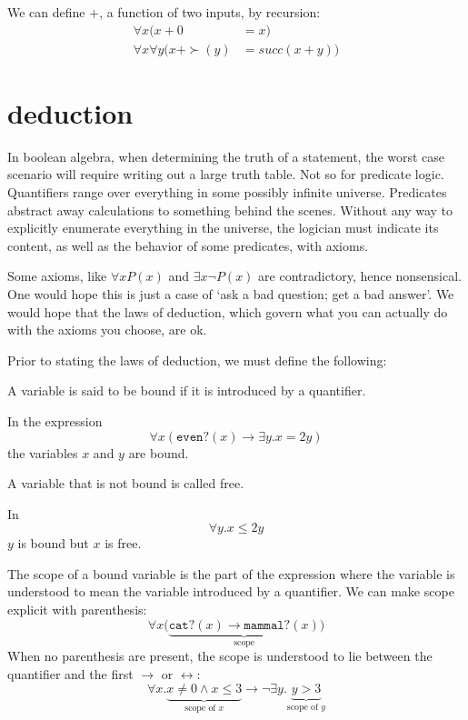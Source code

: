\documentclass{scrbook}
\renewcommand{\implies}{\to}
\renewcommand{\iff}{\leftrightarrow}
\begin{document}
\begin{defn}[plus]
  \label{defn:peano:+}
  We can define $+$, a function of two inputs, by recursion:
  \begin{align*}
    \forall x (x + 0 &= x) \\
    \forall x \forall y \bigl(x + \succ(y) &= succ(x+y)\bigr)
  \end{align*}
\end{defn}
\section[Deduction]{deduction}
In boolean algebra, when determining the truth of a statement, the worst case scenario will require writing out a large truth table. Not so for predicate logic. Quantifiers range over everything in some possibly infinite universe. Predicates abstract away calculations to something behind the scenes. Without any way to explicitly enumerate everything in the universe, the logician must indicate its content, as well as the behavior of some predicates, with axioms.  

Some axioms, like $\forall x P(x)$ and $\exists x \neg P(x)$ are contradictory, hence nonsensical. One would hope this is just a case of `ask a bad question; get a bad answer'. We would hope that the laws of deduction, which govern what you can actually do with the axioms you choose, are ok. 

Prior to stating the laws of deduction, we must define the following: 
\begin{defn}
  A variable is said to be bound if it is introduced by a quantifier. 
\end{defn}
\begin{example}
  In the expression
  \[
  \forall x (\texttt{even?}(x)\implies \exists y . x=2y)
  \]
  the variables $x$ and $y$ are bound.  
\end{example}
\begin{defn}
  A variable that is not bound is called free. 
\end{defn}
\begin{example}
  In 
  \[
  \forall y . x\leq 2y
  \]
  $y$ is bound but $x$ is free. 
\end{example}
\begin{defn}[scope]
  The scope of a bound variable is the part of the expression where the variable is understood to mean the variable introduced by a quantifier. We can make scope explicit with parenthesis:
  \[
  \forall x \bigl(\underbrace{\texttt{cat?}(x)\implies \texttt{mammal?}(x)}_{\textrm{scope}}\bigr)
  \]
  When no parenthesis are present, the scope is understood to lie between the quantifier and the first $\implies$ or $\iff$:
  \[
  \forall x . \underbrace{x\neq 0\wedge x \leq 3}_{\textrm{scope of $x$}}  \implies \neg \exists y . \underbrace{y > 3}_{\textrm{scope of $y$}}
  \]
\end{defn}
\end{document}
